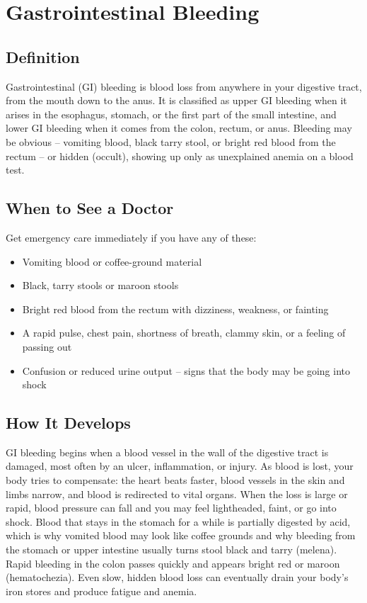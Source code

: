 \chapter{Gastrointestinal Bleeding}

\section*{Definition}
Gastrointestinal (GI) bleeding is blood loss from anywhere in your digestive tract, from the mouth down to the anus. It is classified as upper GI bleeding when it arises in the esophagus, stomach, or the first part of the small intestine, and lower GI bleeding when it comes from the colon, rectum, or anus. Bleeding may be obvious -- vomiting blood, black tarry stool, or bright red blood from the rectum -- or hidden (occult), showing up only as unexplained anemia on a blood test.

\section*{When to See a Doctor}
Get emergency care immediately if you have any of these:
\begin{itemize}
  \item Vomiting blood or coffee-ground material
  \item Black, tarry stools or maroon stools
  \item Bright red blood from the rectum with dizziness, weakness, or fainting
  \item A rapid pulse, chest pain, shortness of breath, clammy skin, or a feeling of passing out
  \item Confusion or reduced urine output -- signs that the body may be going into shock
\end{itemize}

\section*{How It Develops}
GI bleeding begins when a blood vessel in the wall of the digestive tract is damaged, most often by an ulcer, inflammation, or injury. As blood is lost, your body tries to compensate: the heart beats faster, blood vessels in the skin and limbs narrow, and blood is redirected to vital organs. When the loss is large or rapid, blood pressure can fall and you may feel lightheaded, faint, or go into shock. Blood that stays in the stomach for a while is partially digested by acid, which is why vomited blood may look like coffee grounds and why bleeding from the stomach or upper intestine usually turns stool black and tarry (melena). Rapid bleeding in the colon passes quickly and appears bright red or maroon (hematochezia). Even slow, hidden blood loss can eventually drain your body's iron stores and produce fatigue and anemia.

